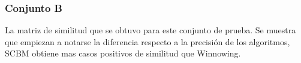 \subsubsection{Conjunto B}
La matriz de similitud que se obtuvo para este conjunto de prueba. Se muestra que empiezan a notarse la diferencia respecto a la precisión de los algoritmos, SCBM obtiene mas casos positivos de similitud que Winnowing.
\begin{figure}[!h]
\centering
{}
\hspace{-1.5cm}
\hspace{-1.5cm}
\end{figure}
